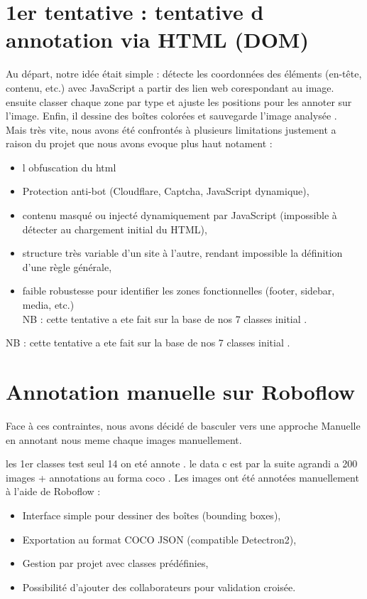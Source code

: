 \documentclass[12pt,a4paper]{report}
\begin{document}
\section{1er tentative : tentative d annotation via HTML (DOM)}

Au départ, notre idée était simple : détecte les coordonnées des éléments (en-tête, contenu, etc.) avec JavaScript a partir des lien web corespondant au image.
ensuite classer chaque zone par type et ajuste les positions pour les annoter sur l'image.
 Enfin, il dessine des boîtes colorées et sauvegarde l'image analysée .\\

 Mais très vite, nous avons été confrontés à plusieurs limitations justement a raison du projet que nous avons evoque plus haut notament : \\
\begin{itemize}


 \item l obfuscation du html 
\item Protection anti-bot (Cloudflare, Captcha, JavaScript dynamique),
\item contenu masqué ou injecté dynamiquement par JavaScript (impossible à détecter au chargement initial du HTML),
\item structure très variable d'un site à l'autre, rendant impossible la définition d'une règle générale,
\item faible robustesse pour identifier les zones fonctionnelles (footer, sidebar, media, etc.) \\

NB : cette tentative a ete fait sur la base de nos 7  classes initial .
\end{itemize}
NB : cette tentative a ete fait sur la base de nos 7  classes initial .


\section{Annotation manuelle sur Roboflow}
Face à ces contraintes, nous avons décidé de basculer vers une approche Manuelle en annotant nous meme chaque images manuellement.

les 1er classes test seul 14 on eté annote .
le data c est par la suite agrandi a 200 images + annotations  au forma coco .
Les images  ont été annotées manuellement à l'aide de Roboflow :
\begin{itemize}
\item Interface simple pour dessiner des boîtes (bounding boxes),
\item Exportation au format COCO JSON (compatible Detectron2),
\item Gestion par projet avec classes prédéfinies,
\item Possibilité d'ajouter des collaborateurs pour validation croisée.
\end{itemize}
\end{document}

